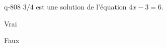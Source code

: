\begin{truefalse}{q-808}
$3/4$ est une solution de l'équation $4x-3=6$.
\item Vrai
\item* Faux
\end{truefalse}

